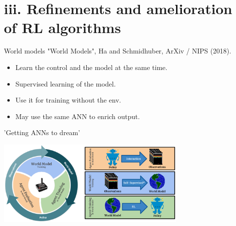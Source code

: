 \documentclass{beamer}
\begin{document}
\section{iii. Refinements and amelioration of RL algorithms}

\begin{frame}{World models}
"World Models", Ha and Schmidhuber, ArXiv / NIPS (2018).
 
    \begin{itemize}
        \item Learn the control and the model at the same time.
        \item Supervised learning of the model.
        \item Use it for training without the env.
        \item May use the same ANN to enrich output.
    \end{itemize}

    \begin{center}
    'Getting ANNs to dream'
    \end{center}

    \begin{center}
    \includegraphics[width=0.70\textwidth]{Figures/world_model}
    \end{center}

\end{frame}
\end{document}
